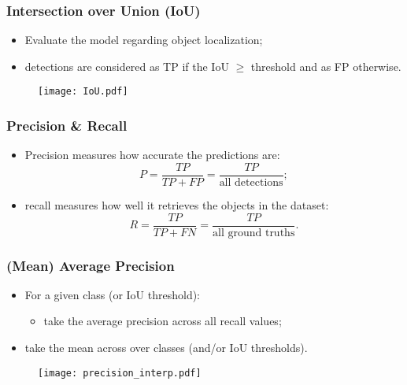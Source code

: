 \documentclass{beamer}
\begin{document}
			\begin{frame}\frametitle{Intersection over Union (IoU)}
				\begin{itemize}
					\item Evaluate the model regarding object localization;
					\item detections are considered as TP if the IoU $\geq$ threshold and as FP otherwise.
				\end{itemize}
				\begin{figure}[htb]
					\centering
					\texttt{[image: IoU.pdf]}
					\label{fig:IoU}
				\end{figure}

			\end{frame}


			\begin{frame}\frametitle{Precision \& Recall}
				\begin{itemize}
					\item Precision measures how accurate the predictions are:
					\begin{equation*}
						P = \frac{TP}{TP + FP} = \frac{TP}{\textrm{all detections}};
						\label{eq:precision}
						\end{equation*}
					\item recall measures how well it retrieves the objects in the dataset:
					\begin{equation*}
						R = \frac{TP}{TP + FN} = \frac{TP}{\textrm{all ground truths}}.
						\label{eq:recall}
						\end{equation*}
				\end{itemize}
			\end{frame}


			\begin{frame}\frametitle{(Mean) Average Precision}
				\begin{itemize}
					\item For a given class (or IoU threshold):
				\begin{itemize}
					\item take the average precision across all recall values;
				\end{itemize}
				\item take the mean across over classes (and/or IoU thresholds).
				\end{itemize}
				\begin{figure}[bh!]
					\centering
					\texttt{[image: precision\_interp.pdf]}
					\label{fig:prec-rec_curve_interp}
				\end{figure}
			\end{frame}
\end{document}
